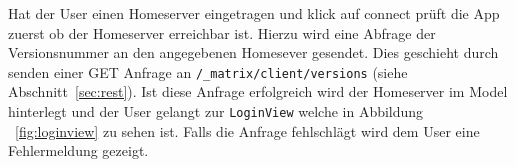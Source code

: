     Hat der User einen Homeserver eingetragen und klick auf connect prüft die App zuerst ob der Homeserver erreichbar ist.
    Hierzu wird eine Abfrage der Versionsnummer an den angegebenen Homesever gesendet.
    Dies geschieht durch senden einer GET Anfrage an \texttt{/\_matrix/client/versions} (siehe Abschnitt~\ref{sec:rest}).
    Ist diese Anfrage erfolgreich wird der Homeserver im Model hinterlegt und der User gelangt zur \texttt{LoginView} welche in Abbildung ~\ref{fig:loginview} zu sehen ist.
    Falls die Anfrage fehlschlägt wird dem User eine Fehlermeldung gezeigt.
